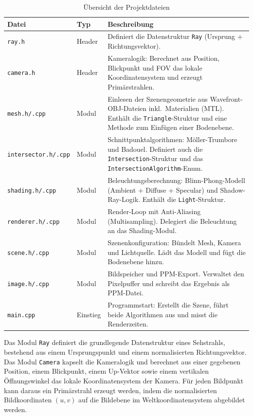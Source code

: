 \documentclass[11pt, a4paper]{article}
\begin{document}
\begin{table}[H]
    \centering
    \caption{Übersicht der Projektdateien}
    \label{tab:dateistruktur}
    \begin{tabularx}{\textwidth}{l l X}
        \toprule
        \textbf{Datei} & \textbf{Typ} & \textbf{Beschreibung} \\
        \midrule
        \texttt{ray.h}         & Header & Definiert die Datenstruktur \texttt{Ray} (Ursprung + Richtungsvektor). \\
        \texttt{camera.h}      & Header & Kameralogik: Berechnet aus Position, Blickpunkt und FOV das lokale Koordinatensystem und erzeugt Primärstrahlen. \\
        \texttt{mesh.h/.cpp}   & Modul  & Einlesen der Szenengeometrie aus Wavefront-OBJ-Dateien inkl.\ Materialien (MTL). Enthält die \texttt{Triangle}-Struktur und eine Methode zum Einfügen einer Bodenebene. \\
        \texttt{intersector.h/.cpp} & Modul & Schnittpunktalgorithmen: Möller-Trumbore und Badouel. Definiert auch die \texttt{Intersection}-Struktur und das \texttt{IntersectionAlgorithm}-Enum. \\
        \texttt{shading.h/.cpp}    & Modul & Beleuchtungsberechnung: Blinn-Phong-Modell (Ambient + Diffuse + Specular) und Shadow-Ray-Logik. Enthält die \texttt{Light}-Struktur. \\
        \texttt{renderer.h/.cpp}   & Modul & Render-Loop mit Anti-Aliasing (Multisampling). Delegiert die Beleuchtung an das Shading-Modul. \\
        \texttt{scene.h/.cpp}      & Modul & Szenenkonfiguration: Bündelt Mesh, Kamera und Lichtquelle. Lädt das Modell und fügt die Bodenebene hinzu. \\
        \texttt{image.h/.cpp}      & Modul & Bildspeicher und PPM-Export. Verwaltet den Pixelpuffer und schreibt das Ergebnis als PPM-Datei. \\
        \texttt{main.cpp}          & Einstieg & Programmstart: Erstellt die Szene, führt beide Algorithmen aus und misst die Renderzeiten. \\
        \bottomrule
    \end{tabularx}
\end{table}

Das Modul \texttt{Ray} definiert die grundlegende Datenstruktur eines Sehstrahls, bestehend aus einem Ursprungspunkt und einem normalisierten Richtungsvektor. Das Modul \texttt{Camera} kapselt die Kameralogik und berechnet aus einer gegebenen Position, einem Blickpunkt, einem Up-Vektor sowie einem vertikalen Öffnungswinkel das lokale Koordinatensystem der Kamera. Für jeden Bildpunkt kann daraus ein Primärstrahl erzeugt werden, indem die normalisierten Bildkoordinaten $(u, v)$ auf die Bildebene im Weltkoordinatensystem abgebildet werden.
\end{document}
